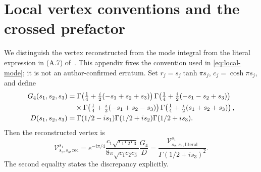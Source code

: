 \section{Local vertex conventions and the crossed prefactor}
\label{app:vertex}
We distinguish the vertex reconstructed from the mode integral from the
literal expression in (A.7) of~\cite{KL}. This appendix fixes the convention
used in \eqref{eq:local-mode}; it is not an author-confirmed erratum.
Set $r_j=s_j\tanh\pi s_j$, $c_j=\cosh\pi s_j$, and define
\begin{align}
 G_4(s_1,s_2,s_3)
 &=\Gamma\!\left(\tfrac14+\tfrac i2(-s_1+s_2+s_3)\right)
   \Gamma\!\left(\tfrac14+\tfrac i2(-s_1-s_2+s_3)\right)\notag\\
 &\quad\times
   \Gamma\!\left(\tfrac14+\tfrac i2(-s_1+s_2-s_3)\right)
   \Gamma\!\left(\tfrac14+\tfrac i2(s_1+s_2+s_3)\right),\\
 D(s_1,s_2,s_3)
 &=\Gamma(1/2-is_1)\Gamma(1/2+is_2)\Gamma(1/2+is_3).
\end{align}
Then the reconstructed vertex is
\begin{equation}
 \mathcal V^{s_1}_{s_2,s_3,\mathrm{rec}}
 =e^{-i\pi/4}\frac{c_1\sqrt{r_1r_2r_3}}
                    {8\pi\sqrt{c_1c_2c_3}}\frac{G_4}{D}
 =\frac{\mathcal V^{s_1}_{s_2,s_3,\mathrm{literal}}}
        {\Gamma(1/2+is_3)^2}.
 \label{eq:reconstructed-vertex}
\end{equation}
The second equality states the discrepancy explicitly.

